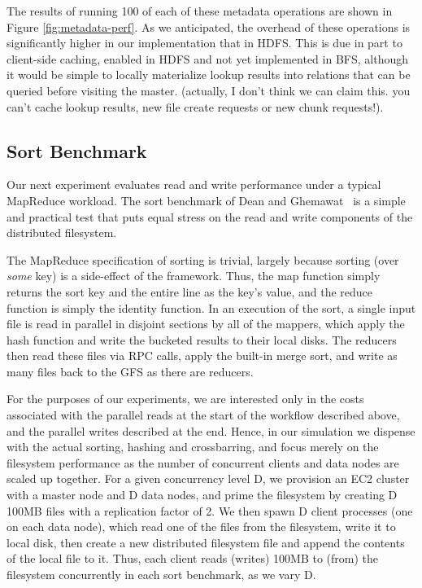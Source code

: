 \documentclass{article}
\begin{document}
The results of running 100 of each of these metadata operations are
shown in Figure \ref{fig:metadata-perf}.  As we anticipated, the
overhead of these operations is significantly higher in our
implementation that in HDFS.  This is due in part to client-side
caching, enabled in HDFS and not yet implemented in BFS, although it
would be simple to locally materialize lookup results into relations
that can be queried before visiting the master. (actually, I don't
think we can claim this.  you can't cache lookup results, new file
create requests or new chunk requests!).

\subsection{Sort Benchmark}
Our next experiment evaluates read and write performance under a
typical MapReduce workload.  The sort benchmark of Dean and
Ghemawat~\cite{mapreduce} is a simple and practical test that puts
equal stress on the read and write components of the distributed
filesystem.

The MapReduce specification of sorting is trivial, largely because
sorting (over \emph{some} key) is a side-effect of the framework.
Thus, the map function simply returns the sort key and the entire line
as the key's value, and the reduce function is simply the identity
function.  In an execution of the sort, a single input file is read in
parallel in disjoint sections by all of the mappers, which apply the
hash function and write the bucketed results to their local disks.
The reducers then read these files via RPC calls, apply the built-in
merge sort, and write as many files back to the GFS as there are
reducers.

For the purposes of our experiments, we are interested only in the
costs associated with the parallel reads at the start of the workflow
described above, and the parallel writes described at the end.  Hence,
in our simulation we dispense with the actual sorting, hashing and
crossbarring, and focus merely on the filesystem performance as the
number of concurrent clients and data nodes are scaled up together.
For a given concurrency level D, we provision an EC2 cluster with a
master node and D data nodes, and prime the filesystem by creating D
100MB files with a replication factor of 2.  We then spawn D client
processes (one on each data node), which read one of the files from the
filesystem, write it to local disk, then create a new distributed
filesystem file and append the contents of the local file to it.
Thus, each client reads (writes) 100MB to (from) the filesystem
concurrently in each sort benchmark, as we vary D.
\end{document}

